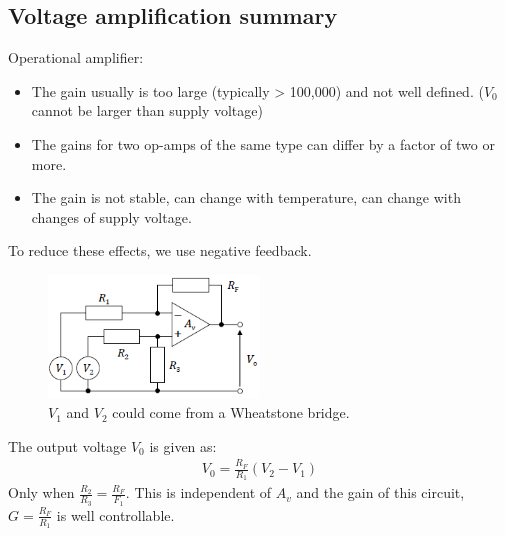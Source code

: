 \documentclass[class=report, crop=false, 12pt,a4paper]{standalone}
\begin{document}
\subsection{Voltage amplification summary}
Operational amplifier:
\begin{itemize}
  \item The gain usually is too large (typically > 100,000) and not well defined. ($V_0$ cannot be larger than supply voltage)
  \item The gains for two op-amps of the same type can differ by a factor of two or more.
  \item The gain is not stable, can change with temperature, can change with changes of supply voltage.
\end{itemize}
To reduce these effects, we use negative feedback.
\begin{figure}[H]
  \centering
  \includegraphics[width = 0.5\textwidth]{../img/diagram51.png}
  \caption{$V_1$ and $V_2$ could come from a Wheatstone bridge.}
\end{figure}
The output voltage $V_0$ is given as: 
\begin{gather}
  V_0 = \frac{R_F}{R_1}(V_2 - V_1)
\end{gather}
Only when $\frac{R_2}{R_3} = \frac{R_F}{F_1}$. This is independent of $A_v$ and the gain of this circuit, $G = \frac{R_F}{R_1}$ is well controllable.
\end{document}
